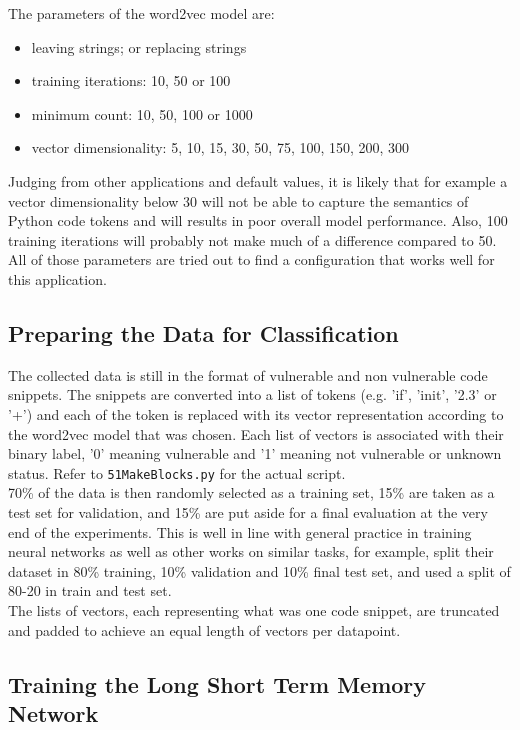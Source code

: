\documentclass[
	a4paper,
	pagesize,
	pdftex,
	12pt,
	twoside, %
	BCOR=5mm, %
	ngerman,
	fleqn,
	final,
	]{scrartcl}
\begin{document}
The parameters of the word2vec model are:
\begin{itemize}[noitemsep]
	\item leaving strings; or replacing strings
	\item training iterations: 10, 50 or 100
	\item minimum count: 10, 50, 100 or 1000
	\item vector dimensionality: 5, 10, 15, 30, 50, 75, 100, 150, 200, 300
\end{itemize}

Judging from other applications and default values, it is likely that for example a vector dimensionality below 30 will not be able to capture the semantics of Python code tokens and will results in poor overall model performance. Also, 100 training iterations will probably not make much of a difference compared to 50. All of those parameters are tried out to find a configuration that works well for this application.

\subsection{Preparing the Data for Classification}
The collected data is still in the format of vulnerable and non vulnerable code snippets. The snippets are converted into a list of tokens (e.g. 'if', 'init', '2.3' or '+') and each of the token is replaced with its vector representation according to the word2vec model that was chosen. Each list of vectors is associated with their binary label, '0' meaning vulnerable and '1' meaning not vulnerable or unknown status. Refer to \texttt{51MakeBlocks.py} for the actual script.\\
70\% of the data is then randomly selected as a training set, 15\% are taken as a test set for validation, and 15\% are put aside for a final evaluation at the very end of the experiments. This is well in line with general practice in training neural networks as well as other works on similar tasks, for example, \cite{Russell.2018} split their dataset in 80\% training, 10\% validation and 10\% final test set, and \cite{Li.2018} used a split of 80-20 in train and test set. \\
The lists of vectors, each representing what was one code snippet, are truncated and padded to achieve an equal length of vectors per datapoint.

\subsection{Training the Long Short Term Memory Network}
\end{document}
